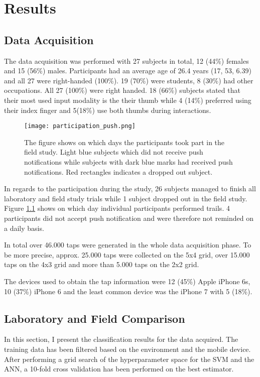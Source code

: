 \chapter{Results\label{cha:chapter6}}
\section{Data Acquisition}
The data acquisition was performed with 27 subjects in total, 12 (44\%) females and 15 (56\%) males. Participants had an average age of 26.4 years (17, 53, 6.39) and all 27 were right-handed (100\%). 19 (70\%) were students, 8 (30\%) had other occupations. All 27 (100\%) were right handed.
18 (66\%) subjects stated that their most used input modality is the their thumb while 4 (14\%) preferred using their index finger and 5(18\%) use both thumbs during interactions.\\

\begin{figure}[h!]
  \centering
  \texttt{[image: participation\_push.png]}
  \caption{The figure shows on which days the participants took part in the field study. Light blue subjects which did not receive push notifications while subjects with dark blue marks had received push notifications. Red rectangles indicates a dropped out subject.} \label{fig:participation}
\end{figure}

In regards to the participation during the study, 26 subjects managed to finish all laboratory and field study trials while 1 subject dropped out in the field study. Figure \ref{fig:participation} shows on which day individual participants performed trails. 4 participants did not accept push notification and were therefore not reminded on a daily basis.

In total over 46.000 taps were generated in the whole data acquisition phase. To be more precise, approx. 25.000 taps were collected on the 5x4 grid, over 15.000 taps on the 4x3 grid and more than 5.000 taps on the 2x2 grid.

The devices used to obtain the tap information were 12 (45\%) Apple iPhone 6s, 10 (37\%) iPhone 6 and the least common device was the iPhone 7 with 5 (18\%).

\section{Laboratory and Field Comparison}
In this section, I present the classification results for the data acquired. The training data has been filtered based on the environment and the mobile device. After performing a grid search of the hyperparameter space for the SVM and the ANN, a 10-fold cross validation has been performed on the best estimator.

